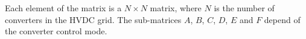 \documentclass[11pt,fleqn]{book} %
\begin{document}
Each element of the matrix is a $N \times N$ matrix, where $N$ is the number of converters in the HVDC grid. The sub-matrices $A$, $B$, $C$, $D$, $E$ and $F$ depend of the converter control mode.




\end{document}
